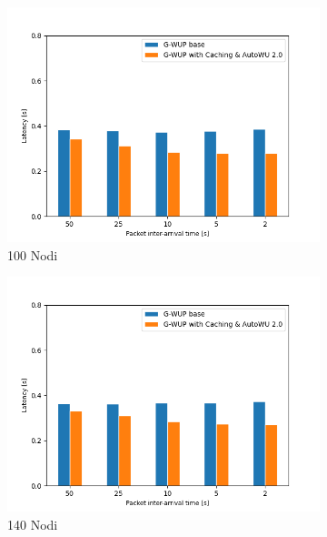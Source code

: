 \begin{figure}[h!]
  \begin{subfigure}[t]{0.329\linewidth}
    \includegraphics[width=1.13\linewidth]{Contents/Images/graphs/analisi_final2.0/latency/latency_100.png}
    \caption{100 Nodi}
  \end{subfigure}
  \begin{subfigure}[t]{0.329\linewidth}
    \includegraphics[width=1.13\linewidth]{Contents/Images/graphs/analisi_final2.0/latency/latency_140.png}
    \caption{140 Nodi}
  \end{subfigure}
  \begin{subfigure}[t]{0.329\linewidth}

\end{subfigure}
\end{figure}
